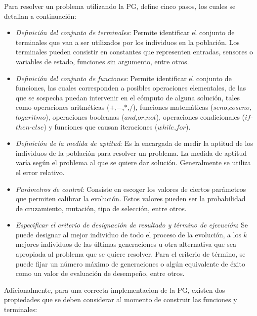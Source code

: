 
Para resolver un problema utilizando la PG, \cite{koza_1992} define cinco pasos, los cuales se detallan a continuación:

\begin{itemize}
	\item \textit{Definición del conjunto de terminales}: Permite identificar el conjunto de terminales que van a ser utilizados por los individuos en la población. Los terminales pueden consistir en constantes que representen entradas, sensores o variables de estado, funciones sin argumento, entre otros.

	\item \textit{Definición del conjunto de funciones}: Permite identificar el conjunto de funciones, las cuales corresponden a posibles operaciones elementales, de las que se sospecha puedan intervenir en el cómputo de alguna solución, tales como operaciones aritméticas ($+$,$-$,$*$,$/$), funciones matemáticas ($seno$,$coseno$,$logaritmo$), operaciones booleanas ($and$,$or$,$not$), operaciones condicionales ($if$-$then$-$else$) y funciones que causan iteraciones ($while$,$for$).

	\item \textit{Definición de la medida de aptitud}: Es la encargada de medir la aptitud de los individuos de la población para resolver un problema. La medida de aptitud varía según el problema al que se quiere dar solución. Generalmente se utiliza el error relativo.

	\item \textit{Parámetros de control}: Consiste en escoger los valores de ciertos parámetros que permiten calibrar la evolución. Estos valores pueden ser la probabilidad de cruzamiento, mutación, tipo de selección, entre otros.

	\item \textit{Especificar el criterio de designación de resultado y término de ejecución}: Se puede designar al mejor individuo de todo el proceso de la evolución, a los $k$ mejores individuos de las últimas generaciones u otra alternativa que sea apropiada al problema que se quiere resolver. Para el criterio de término, se puede fijar un número máximo de generaciones o algún equivalente de éxito como un valor de evaluación de desempeño, entre otros.
\end{itemize}



Adicionalmente, para una correcta implementacion de la PG, existen dos propiedades que se deben considerar al momento de construir las funciones y terminales:


